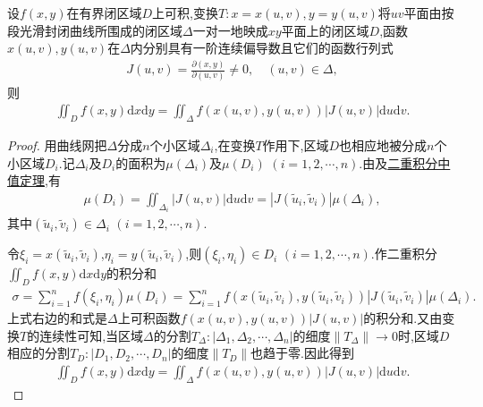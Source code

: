 \documentclass[../../main.tex]{subfiles}%
\begin{document}
\begin{theorem}\label{theorem:数分--定理21.13}
设$f(x,y)$在有界闭区域$D$上可积,变换$T:x=x(u,v),y=y(u,v)$将$uv$平面由按段光滑封闭曲线所围成的闭区域$\Delta$一对一地映成$xy$平面上的闭区域$D$,函数$x(u,v),y(u,v)$在$\Delta$内分别具有一阶连续偏导数且它们的函数行列式
\begin{align*}
J(u,v)=\frac{\partial(x,y)}{\partial(u,v)}\neq0,\quad(u,v)\in\Delta,
\end{align*}
则
\begin{align*}
\iint_{D}f(x,y)\mathrm{d}x\mathrm{d}y=\iint_{\Delta}f(x(u,v),y(u,v))|J(u,v)|\mathrm{d}u\mathrm{d}v.
\end{align*}
\end{theorem}
\begin{proof}
用曲线网把$\Delta$分成$n$个小区域$\Delta_i$,在变换$T$作用下,区域$D$也相应地被分成$n$个小区域$D_i$.记$\Delta_i$及$D_i$的面积为$\mu(\Delta_i)$及$\mu(D_i)$ $(i=1,2,\cdots,n)$.由及\hyperref[theorem:二重积分中值定理]{二重积分中值定理},有
\begin{align*}
\mu(D_i)=\iint_{\Delta_i}|J(u,v)|\mathrm{d}u\mathrm{d}v=|J(\tilde{u}_i,\tilde{v}_i)|\mu(\Delta_i),
\end{align*}
其中$(\tilde{u}_i,\tilde{v}_i)\in\Delta_i$ $(i=1,2,\cdots,n)$.

令$\xi_i=x(\tilde{u}_i,\tilde{v}_i)$,$\eta_i=y(\tilde{u}_i,\tilde{v}_i)$,则$(\xi_i,\eta_i)\in D_i$ $(i=1,2,\cdots,n)$.作二重积分$\iint_{D}f(x,y)\mathrm{d}x\mathrm{d}y$的积分和
\begin{align*}
\sigma=\sum_{i=1}^n f(\xi_i,\eta_i)\mu(D_i)=\sum_{i=1}^n f(x(\tilde{u}_i,\tilde{v}_i),y(\tilde{u}_i,\tilde{v}_i))|J(\tilde{u}_i,\tilde{v}_i)|\mu(\Delta_i).
\end{align*}
上式右边的和式是$\Delta$上可积函数$f(x(u,v),y(u,v))|J(u,v)|$的积分和.又由变换$T$的连续性可知,当区域$\Delta$的分割$T_{\Delta}:|\Delta_1,\Delta_2,\cdots,\Delta_n|$的细度$\|T_{\Delta}\|\to0$时,区域$D$相应的分割$T_D:|D_1,D_2,\cdots,D_n|$的细度$\|T_D\|$也趋于零.因此得到
\begin{align*}
\iint_{D}f(x,y)\mathrm{d}x\mathrm{d}y=\iint_{\Delta}f(x(u,v),y(u,v))|J(u,v)|\mathrm{d}u\mathrm{d}v.
\end{align*}
\end{proof}
\end{document}
